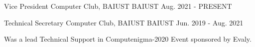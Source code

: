 

\begin{cventries}

  \cventry
    {Vice President} %
    {Computer Club, BAIUST} %
    {BAIUST} %
    {Aug. 2021 - PRESENT} %
    {
      \begin{cvitems} %
      \end{cvitems}
    }

  \cventry
    {Technical Secretary} %
    {Computer Club, BAIUST} %
    {BAIUST} %
    {Jun. 2019 - Aug. 2021} %
    {
      \begin{cvitems} %
        \item {Was a lead Technical Support in Computenigma-2020 Event sponsored by Evaly.}
      \end{cvitems}
    }



\end{cventries}
